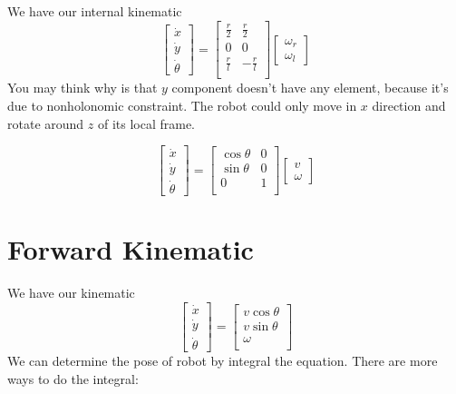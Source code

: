 We have our internal kinematic
\begin{equation}
	\begin{bmatrix}
		\dot{x}      \\
		\dot{y}      \\
		\dot{\theta} 
	\end{bmatrix}=
	\begin{bmatrix}
		\frac{r}{2} & \frac{r}{2}  \\
		0           & 0            \\
		\frac{r}{l} & -\frac{r}{l} \\
	\end{bmatrix}
	\begin{bmatrix}
		\omega_r\\
		\omega_l
	\end{bmatrix}
\end{equation}
You may think why is that $y$ component doesn't have any element, because it's due to nonholonomic constraint. The robot could only move in $x$ direction and rotate around $z$ of its local frame.\par
\begin{tcolorbox}[title=We have our external kinematic]
	\begin{equation}
		\begin{bmatrix}
			\dot{x}      \\
			\dot{y}      \\
			\dot{\theta} 
		\end{bmatrix}=
		\begin{bmatrix}
			\cos\theta & 0  \\
			\sin\theta & 0            \\
			0 & 1\\
		\end{bmatrix}
		\begin{bmatrix}
			v\\
			\omega
		\end{bmatrix}
	\end{equation}
\end{tcolorbox}



\section{Forward Kinematic}
We have our kinematic
\begin{equation}
	\begin{bmatrix}
		\dot{x}      \\
		\dot{y}      \\
		\dot{\theta} 
	\end{bmatrix}=
	\begin{bmatrix}
		v\cos\theta\\
		v\sin\theta\\
		\omega\\
	\end{bmatrix}
\end{equation}
We can determine the pose of robot by integral the equation. There are more ways to do the integral:
